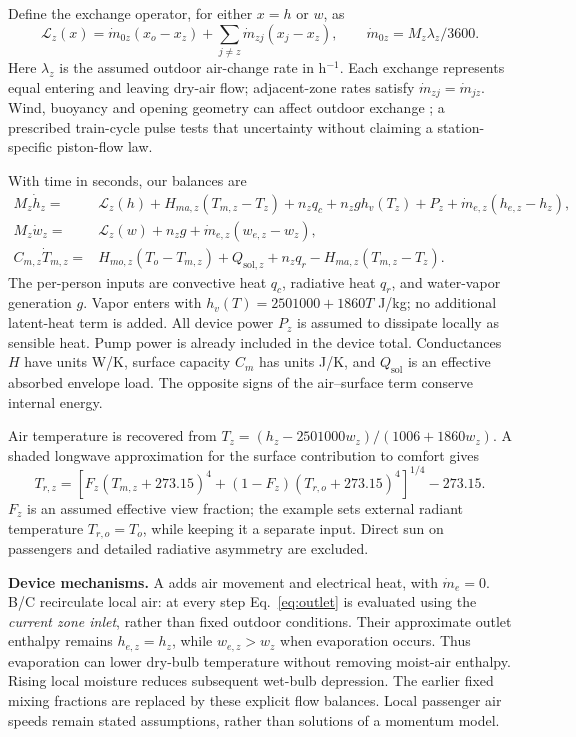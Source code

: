 Define the exchange operator, for either $x=h$ or $w$, as
\begin{equation}
 \mathcal L_z(x)=\dot m_{0z}(x_o-x_z)+\sum_{j\ne z}\dot m_{zj}(x_j-x_z),
 \qquad \dot m_{0z}=M_z\lambda_z/3600.
\label{eq:rail-exchange}
\end{equation}
Here $\lambda_z$ is the assumed outdoor air-change rate in h$^{-1}$. Each exchange represents equal entering and leaving dry-air flow; adjacent-zone rates satisfy $\dot m_{zj}=\dot m_{jz}$. Wind, buoyancy and opening geometry can affect outdoor exchange \cite{ventilation}; a prescribed train-cycle pulse tests that uncertainty without claiming a station-specific piston-flow law.

With time in seconds, our balances are
\begin{align}
 M_z\dot h_z={}&\mathcal L_z(h)+H_{ma,z}(T_{m,z}-T_z)
 +n_zq_c+n_zg h_v(T_z)+P_z
 +\dot m_{e,z}(h_{e,z}-h_z),\label{eq:rail-enthalpy}\\
 M_z\dot w_z={}&\mathcal L_z(w)+n_zg+
 \dot m_{e,z}(w_{e,z}-w_z),\label{eq:rail-moisture}\\
 C_{m,z}\dot T_{m,z}={}&H_{mo,z}(T_o-T_{m,z})+Q_{\mathrm{sol},z}
 +n_zq_r-H_{ma,z}(T_{m,z}-T_z).\label{eq:rail-surface}
\end{align}
The per-person inputs are convective heat $q_c$, radiative heat $q_r$, and water-vapor generation $g$. Vapor enters with $h_v(T)=2501000+1860T$ J/kg; no additional latent-heat term is added. All device power $P_z$ is assumed to dissipate locally as sensible heat. Pump power is already included in the device total. Conductances $H$ have units W/K, surface capacity $C_m$ has units J/K, and $Q_{\mathrm{sol}}$ is an effective absorbed envelope load. The opposite signs of the air--surface term conserve internal energy.

Air temperature is recovered from $T_z=(h_z-2501000w_z)/(1006+1860w_z)$. A shaded longwave approximation for the surface contribution to comfort \cite{thermalcomfort} gives
\begin{equation}
 T_{r,z}=\left[F_z(T_{m,z}+273.15)^4+(1-F_z)(T_{r,o}+273.15)^4\right]^{1/4}-273.15.
\label{eq:rail-mrt}
\end{equation}
$F_z$ is an assumed effective view fraction; the example sets external radiant temperature $T_{r,o}=T_o$, while keeping it a separate input. Direct sun on passengers and detailed radiative asymmetry are excluded.

\noindent\textbf{Device mechanisms.} A adds air movement and electrical heat, with $\dot m_e=0$. B/C recirculate local air: at every step Eq.~\eqref{eq:outlet} is evaluated using the \emph{current zone inlet}, rather than fixed outdoor conditions. Their approximate outlet enthalpy remains $h_{e,z}=h_z$, while $w_{e,z}>w_z$ when evaporation occurs. Thus evaporation can lower dry-bulb temperature without removing moist-air enthalpy. Rising local moisture reduces subsequent wet-bulb depression. The earlier fixed mixing fractions are replaced by these explicit flow balances. Local passenger air speeds remain stated assumptions, rather than solutions of a momentum model.

